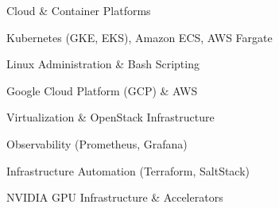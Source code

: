 \begin{skills}{Cloud \& Container Platforms}
    \item Kubernetes (GKE, EKS), Amazon ECS, AWS Fargate
    \item Linux Administration \& Bash Scripting
    \item Google Cloud Platform (GCP) \& AWS
    \item Virtualization \& OpenStack Infrastructure
    \item Observability (Prometheus, Grafana)
    \item Infrastructure Automation (Terraform, SaltStack)
    \item NVIDIA GPU Infrastructure \& Accelerators
\end{skills}

